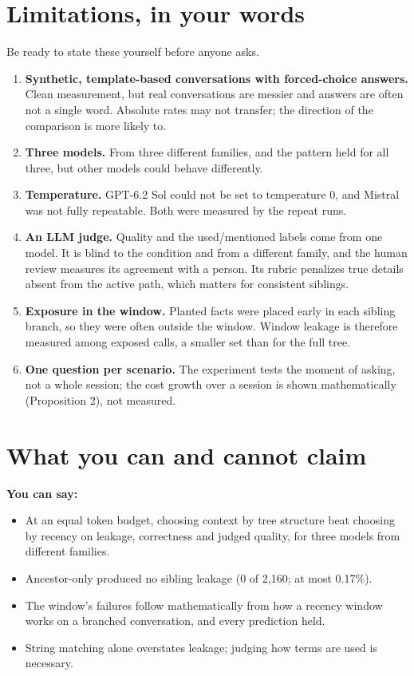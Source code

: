 \section{Limitations, in your words}

Be ready to state these yourself before anyone asks.

\begin{enumerate}
\item \textbf{Synthetic, template-based conversations with forced-choice answers.} Clean measurement, but real conversations are messier and answers are often not a single word. Absolute rates may not transfer; the direction of the comparison is more likely to.
\item \textbf{Three models.} From three different families, and the pattern held for all three, but other models could behave differently.
\item \textbf{Temperature.} GPT-6.2 Sol could not be set to temperature 0, and Mistral was not fully repeatable. Both were measured by the repeat runs.
\item \textbf{An LLM judge.} Quality and the used/mentioned labels come from one model. It is blind to the condition and from a different family, and the human review measures its agreement with a person. Its rubric penalizes true details absent from the active path, which matters for consistent siblings.
\item \textbf{Exposure in the window.} Planted facts were placed early in each sibling branch, so they were often outside the window. Window leakage is therefore measured among exposed calls, a smaller set than for the full tree.
\item \textbf{One question per scenario.} The experiment tests the moment of asking, not a whole session; the cost growth over a session is shown mathematically (Proposition 2), not measured.
\end{enumerate}

\section{What you can and cannot claim}

\textbf{You can say:}
\begin{itemize}
\item At an equal token budget, choosing context by tree structure beat choosing by recency on leakage, correctness and judged quality, for three models from different families.
\item Ancestor-only produced no sibling leakage (0 of 2,160; at most 0.17\%).
\item The window's failures follow mathematically from how a recency window works on a branched conversation, and every prediction held.
\item String matching alone overstates leakage; judging how terms are used is necessary.
\end{itemize}

